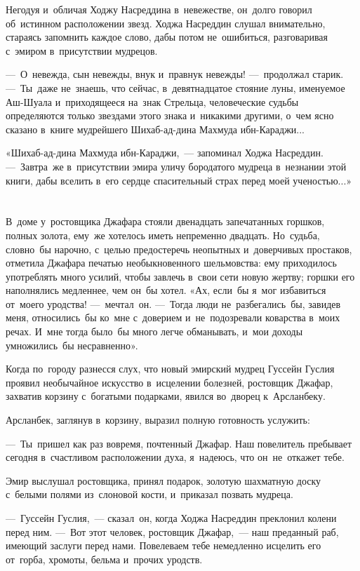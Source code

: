 \documentclass[12pt,a4paper]{book}
\begin{document}
Негодуя и~обличая Ходжу Насреддина в~невежестве, он~долго говорил об~истинном расположении звезд. Ходжа Насреддин слушал внимательно, стараясь запомнить каждое слово, дабы потом не~ошибиться, разговаривая с~эмиром в~присутствии мудрецов.

—~О~невежда, сын невежды, внук и~правнук невежды! —~продолжал старик. —~Ты~даже не~знаешь, что сейчас, в~девятнадцатое стояние луны, именуемое Аш-Шуала и~приходящееся на~знак Стрельца, человеческие судьбы определяются только звездами этого знака и~никакими другими, о~чем ясно сказано в~книге мудрейшего Шихаб-ад-дина Махмуда ибн-Караджи...

«Шихаб-ад-дина Махмуда ибн-Караджи,~— запоминал Ходжа Насреддин. —~Завтра~же в~присутствии эмира уличу бородатого мудреца в~незнании этой книги, дабы вселить в~его сердце спасительный страх перед моей ученостью...»


\chapter{}

В~доме у~ростовщика Джафара стояли двенадцать запечатанных горшков, полных золота, ему~же хотелось иметь непременно двадцать. Но~судьба, словно~бы нарочно, с~целью предостеречь неопытных и~доверчивых простаков, отметила Джафара печатью необыкновенного шельмовства: ему приходилось употреблять много усилий, чтобы завлечь в~свои сети новую жертву; горшки его наполнялись медленнее, чем он~бы хотел. «Ах, если~бы я~мог избавиться от~моего уродства! —~мечтал~он. —~Тогда люди не~разбегались~бы, завидев меня, относились~бы ко~мне с~доверием и~не~подозревали коварства в~моих речах. И~мне тогда было~бы много легче обманывать, и~мои доходы умножились~бы несравненно».

Когда по~городу разнесся слух, что новый эмирский мудрец Гуссейн Гуслия проявил необычайное искусство в~исцелении болезней, ростовщик Джафар, захватив корзину с~богатыми подарками, явился во~дворец к~Арсланбеку.

Арсланбек, заглянув в~корзину, выразил полную готовность услужить:

—~Ты~пришел как раз вовремя, почтенный Джафар. Наш повелитель пребывает сегодня в~счастливом расположении духа, я~надеюсь, что он~не~откажет тебе.

Эмир выслушал ростовщика, принял подарок, золотую шахматную доску с~белыми полями из~слоновой кости, и~приказал позвать мудреца.

—~Гуссейн Гуслия,~— сказал~он, когда Ходжа Насреддин преклонил колени перед ним. —~Вот этот человек, ростовщик Джафар,~— наш преданный раб, имеющий заслуги перед нами. Повелеваем тебе немедленно исцелить его от~горба, хромоты, бельма и~прочих уродств.
\end{document}
